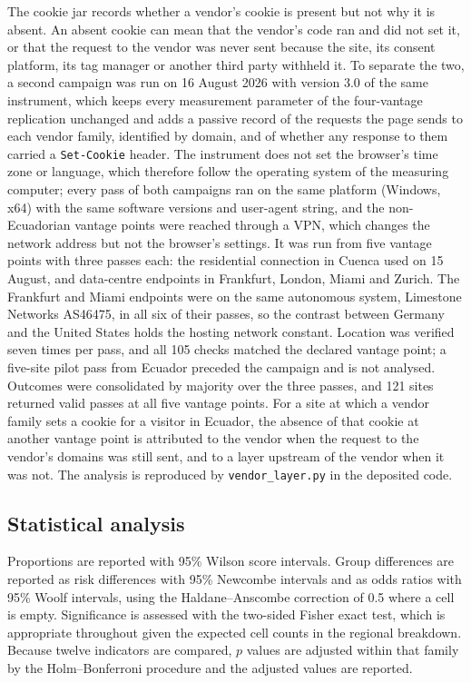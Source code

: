 \documentclass[]{interact}
\begin{document}
The cookie jar records whether a vendor's cookie is present but not why it is absent. An absent cookie can mean that the vendor's code ran and did not set it, or that the request to the vendor was never sent because the site, its consent platform, its tag manager or another third party withheld it. To separate the two, a second campaign was run on 16 August 2026 with version 3.0 of the same instrument, which keeps every measurement parameter of the four-vantage replication unchanged and adds a passive record of the requests the page sends to each vendor family, identified by domain, and of whether any response to them carried a \verb|Set-Cookie| header. The instrument does not set the browser's time zone or language, which therefore follow the operating system of the measuring computer; every pass of both campaigns ran on the same platform (Windows, x64) with the same software versions and user-agent string, and the non-Ecuadorian vantage points were reached through a VPN, which changes the network address but not the browser's settings. It was run from five vantage points with three passes each: the residential connection in Cuenca used on 15 August, and data-centre endpoints in Frankfurt, London, Miami and Zurich. The Frankfurt and Miami endpoints were on the same autonomous system, Limestone Networks AS46475, in all six of their passes, so the contrast between Germany and the United States holds the hosting network constant. Location was verified seven times per pass, and all 105 checks matched the declared vantage point; a five-site pilot pass from Ecuador preceded the campaign and is not analysed. Outcomes were consolidated by majority over the three passes, and 121 sites returned valid passes at all five vantage points. For a site at which a vendor family sets a cookie for a visitor in Ecuador, the absence of that cookie at another vantage point is attributed to the vendor when the request to the vendor's domains was still sent, and to a layer upstream of the vendor when it was not. The analysis is reproduced by \verb|vendor_layer.py| in the deposited code.

\subsection{Statistical analysis}\label{sec:methods-stats}

Proportions are reported with 95\% Wilson score intervals. Group differences are reported as risk differences with 95\% Newcombe intervals and as odds ratios with 95\% Woolf intervals, using the Haldane--Anscombe correction of 0.5 where a cell is empty. Significance is assessed with the two-sided Fisher exact test, which is appropriate throughout given the expected cell counts in the regional breakdown. Because twelve indicators are compared, $p$ values are adjusted within that family by the Holm--Bonferroni procedure and the adjusted values are reported.
\end{document}
